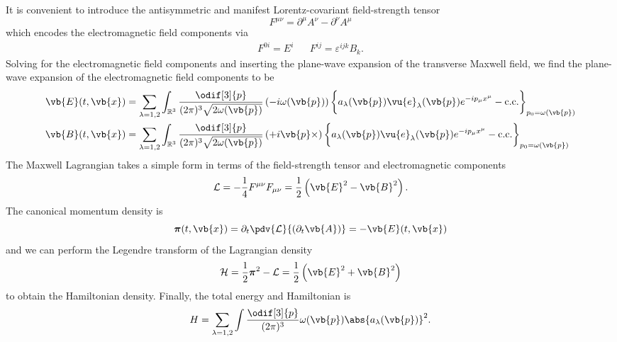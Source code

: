 It is convenient to introduce the antisymmetric and manifest Lorentz-covariant field-strength tensor
\begin{equation}
	F^{\mu\nu}
	=
	\partial^\mu A^\nu
	-
	\partial^\nu A^\mu
\end{equation}
which encodes the electromagnetic field components via
\begin{align}
	F^{0i}
	=
	E^i
	&&
	F^{ij}
	=
	\varepsilon^{ijk}
	B_k
	.
\end{align}
Solving for the electromagnetic field components and inserting the plane-wave expansion of the transverse Maxwell field, we find the plane-wave expansion of the electromagnetic field components to be
\begin{align}
	\vb{E}(t,\vb{x})
	&=
	\sum_{\lambda=1,2}
	\int_{\mathbb{R}^3}
	\frac{\odif[3]{p}}{(2\pi)^3\sqrt{2\omega(\vb{p})}}
	\left(-i\omega(\vb{p})\right)
	\biggl\{
		a_\lambda(\vb{p})
		\vu{e}_\lambda(\vb{p})
		e^{-ip_\mu x^\mu}
		-
		\text{c.c.}
	\biggr\}_{p_0=\omega(\vb{p})}
	\\
	\vb{B}(t,\vb{x})
	&=
	\sum_{\lambda=1,2}
	\int_{\mathbb{R}^3}
	\frac{\odif[3]{p}}{(2\pi)^3\sqrt{2\omega(\vb{p})}}
	\left(+i\vb{p}\times\right)
	\biggl\{
		a_\lambda(\vb{p})
		\vu{e}_\lambda(\vb{p})
		e^{-ip_\mu x^\mu}
		-
		\text{c.c.}
	\biggr\}_{p_0=\omega(\vb{p})}
\end{align}
The Maxwell Lagrangian takes a simple form in terms of the field-strength tensor and electromagnetic components 
\begin{equation}
	\mathcal{L}
	=
	-\frac{1}{4}
	F^{\mu\nu}
	F_{\mu\nu}
	=
	\frac{1}{2}
	\left(
		\vb{E}^2
		-
		\vb{B}^2
	\right)
	.
\end{equation}
The canonical momentum density is
\begin{equation}
	\boldsymbol{\pi}(t,\vb{x})
	=
	\partial_t
	\pdv{\mathcal{L}}{(\partial_t\vb{A})}
	=
	-\vb{E}(t,\vb{x})
\end{equation}
and we can perform the Legendre transform of the Lagrangian density
\begin{equation}
	\mathcal{H}
	=
	\frac{1}{2}
	\boldsymbol{\pi}^2
	-
	\mathcal{L}
	=
	\frac{1}{2}
	\left(
		\vb{E}^2
		+
		\vb{B}^2
	\right)
\end{equation}
to obtain the Hamiltonian density.
Finally, the total energy and Hamiltonian is
\begin{equation}
	H
	=
	\sum_{\lambda=1,2}
	\int\frac{\odif[3]{p}}{(2\pi)^3}
	\omega(\vb{p})
	\abs{a_\lambda(\vb{p})}^2
	.
\end{equation}

